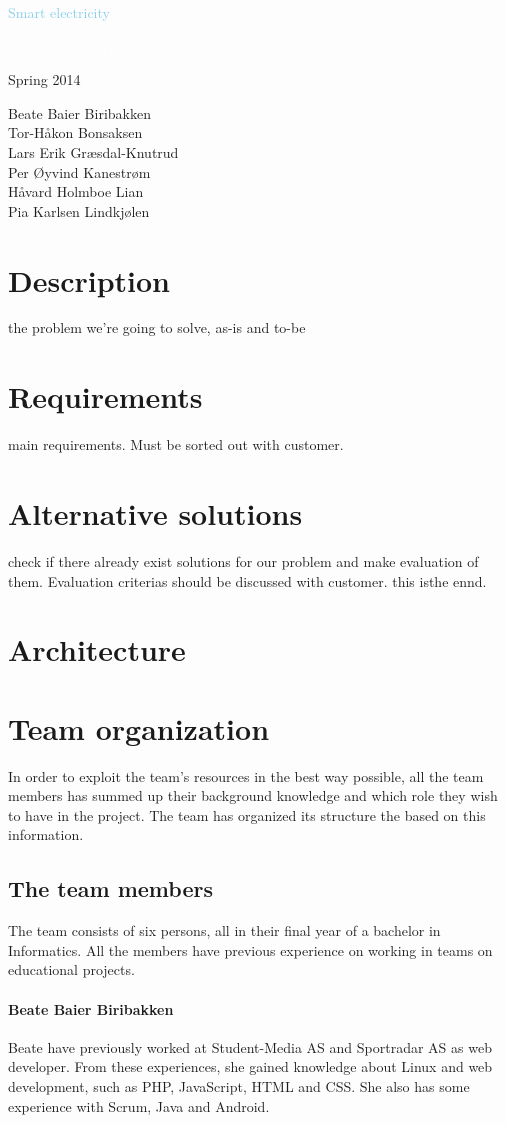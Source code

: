 \documentclass[12pt, oneside]{memoir}
\newcommand*{\titleLL}{\begingroup%
\drop=0.1\textheight
\fboxsep 0.5\baselineskip
\sffamily
\vspace*{\drop}
\centering
{\textcolor{SkyBlue}{\HUGE Smart electricity}}\par
\vspace{0.5\drop}
\colorbox{Dark}{\textcolor{white}{\normalfont\itshape\Large
Project report: IT2901}}\par
\vspace{\drop}
{\Large Spring 2014}\par\vfill
{\footnotesize Beate Baier Biribakken\\
Tor-Håkon	Bonsaksen\\
Lars Erik Græsdal-Knutrud\\
Per	Øyvind	Kanestrøm\\
Håvard	Holmboe	Lian\\
Pia	Karlsen	Lindkjølen\\}\par
\vspace*{\drop}
\endgroup}
\newlength{\drop}%
\begin{document}
\thispagestyle{empty}
\titleLL
\clearpage

\renewcommand\contentsname{\hspace{-1.5cm}Contents}

\tableofcontents*
{}


\cleardoublepage
\pagestyle{plain}




\chapter{Description}
the problem we're going to solve, as-is and to-be
\chapter{Requirements}
main requirements. Must be sorted out with customer.
\chapter{Alternative solutions}
check if there already exist solutions for our problem and make evaluation of them. Evaluation criterias should be discussed with customer. this isthe ennd.

\chapter{Architecture}

\chapter{Team organization}
In order to exploit the team's resources in the best way possible, all the team members has summed up their background knowledge and which role they wish to have in the project. The team has organized its structure the based on this information.

\section{The team members}
The team consists of six persons, all in their final year of a bachelor in Informatics. All the members have previous experience on working in teams on educational projects.

\subsubsection{Beate Baier Biribakken}
Beate have previously worked at Student-Media AS and Sportradar AS as web developer. From these experiences, she gained knowledge about Linux and web development, such as PHP, JavaScript, HTML and CSS. She also has some experience with Scrum, Java and Android.
\end{document}
